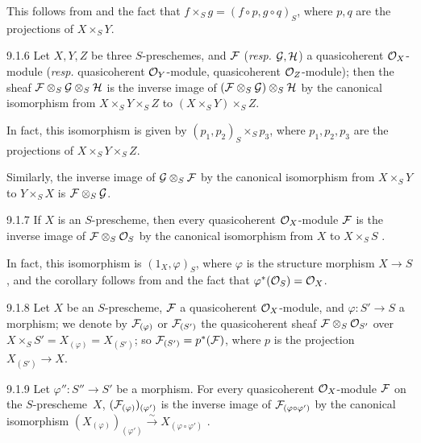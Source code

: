 This follows from  and the fact that $f\times_S g=(f\circ p, g\circ
q)_S$, where $p,q$ are the projections of $X\times_S Y$.

\begin{env}[Corollary]{9.1.6}
\label{cor-1.9.1.6}
Let $X,Y,Z$ be three $S$-preschemes, and
$\mathcal{F}$ (\emph{resp.} $\mathcal{G},\mathcal{H}$) a quasicoherent $\mathcal{O}_X$-module
(\emph{resp.} quasicoherent $\mathcal{O}_Y$-module, quasicoherent $\mathcal{O}_Z$-module); then
the sheaf $\mathcal{F}\otimes_S\mathcal{G}\otimes_S\mathcal{H}$ is the inverse image
of $(\mathcal{F}\otimes_S\mathcal{G})\otimes_S\mathcal{H}$ by the canonical
isomorphism from $X\times_S Y\times_S Z$ to $(X\times_S Y)\times_S Z$.
\end{env}

In fact, this isomorphism is given by $(p_1,p_2)_S\times_S p_3$, where
$p_1,p_2,p_3$ are the projections of $X\times_S Y\times_S Z$.

Similarly, the inverse image of $\mathcal{G}\otimes_S\mathcal{F}$ by the canonical
isomorphism from $X\times_S Y$ to $Y\times_S X$ is $\mathcal{F}\otimes_S\mathcal{G}$.

\begin{env}[Corollary]{9.1.7}
\label{cor-1.9.1.7}
If $X$ is an $S$-prescheme, then every
quasicoherent $\mathcal{O}_X$-module $\mathcal{F}$ is the inverse image of
$\mathcal{F}\otimes_S\mathcal{O}_S$ by the canonical isomorphism from $X$ to $X\times_S S$
.
\end{env}

In fact, this isomorphism is $(1_X,\varphi)_S$, where $\varphi$ is the structure
morphism $X\to S$, and the corollary follows from  and the fact that
$\varphi^\ast(\mathcal{O}_S)=\mathcal{O}_X$.

\begin{env}{9.1.8}
\label{env-1.9.1.8}
Let $X$ be an $S$-prescheme, $\mathcal{F}$ a quasicoherent
$\mathcal{O}_X$-module, and $\varphi\colon S'\to S$ a morphism; we denote by
$\mathcal{F}_{(\varphi)}$ or $\mathcal{F}_{(S')}$ the quasicoherent sheaf
$\mathcal{F}\otimes_S\mathcal{O}_{S'}$ over $X\times_S S'=X_{(\varphi)}=X_{(S')}$; so
$\mathcal{F}_{(S')}=p^\ast(\mathcal{F})$, where $p$ is the projection $X_{(S')}\to X$.
\end{env}

\begin{env}[Proposition]{9.1.9}
\label{prop-1.9.1.9}
Let $\varphi''\colon S''\to S'$ be a morphism.
For every quasicoherent $\mathcal{O}_X$-module $\mathcal{F}$ on the $S$-prescheme~$X$,
$(\mathcal{F}_{(\varphi)})_{(\varphi')}$ is the inverse image of
$\mathcal{F}_{(\varphi\circ\varphi')}$ by the canonical isomorphism
$(X_{(\varphi)})_{(\varphi')}\xrightarrow{\sim}X_{(\varphi\circ\varphi')}$
.
\end{env}

